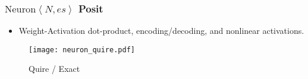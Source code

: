 \begin{frame}
    \frametitle{$\text{Neuron}\left \langle N,es\right \rangle$ Posit}

            \begin{itemize}
		\item<1-> Weight-Activation dot-product, encoding/decoding, and nonlinear activations.
            \end{itemize}

            \begin{figure}
                \centering
                    \centering
                    \texttt{[image: neuron\_quire.pdf]}
                     \vspace{-0.3cm}
                    \caption{Quire / Exact}
                \label{fig:neuron_variations}
            \end{figure}

\end{frame}


